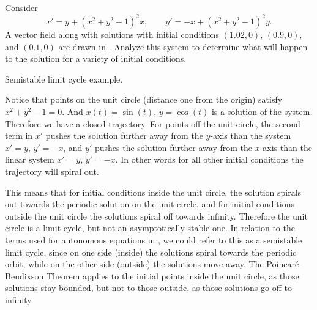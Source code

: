 \documentclass{ximera}
\begin{document}
\begin{example}
    Consider
    \begin{equation*}
        x' = y + {(x^2+y^2-1)}^2 x, \qquad y' = -x + {(x^2+y^2-1)}^2 y.
    \end{equation*}
    A vector field along with solutions with initial conditions $(1.02,0)$, $(0.9,0)$, and $(0.1,0)$ are drawn in . Analyze this system to determine what will happen to the solution for a variety of initial conditions.
    
    \begin{myfig}
        \capstart
        \caption{Semistable limit cycle example.\label{fig:nlin-unstable-limit-cycle}}
    \end{myfig}
\end{example}

\begin{exampleSol}
    Notice that points on the unit circle (distance one from the origin) satisfy $x^2+y^2-1=0$.  And $x(t) = \sin(t)$, $y = \cos(t)$ is a solution of the system.  Therefore we have a closed trajectory. For points off the unit circle, the second term in $x'$ pushes the solution further away from the $y$-axis than the system $x' = y$, $y' = -x$, and $y'$ pushes the solution further away from the $x$-axis than the linear system $x'=y$, $y' = -x$.  In other words for all other initial conditions the trajectory will spiral out.
    
    This means that for initial conditions inside the unit circle, the solution spirals out towards the periodic solution on the unit circle, and for initial conditions outside the unit circle the solutions spiral off towards infinity.  Therefore the unit circle is a limit cycle, but not an asymptotically stable one. In relation to the terms used for autonomous equations in , we could refer to this as a semistable limit cycle, since on one side (inside) the solutions spiral towards the periodic orbit, while on the other side (outside) the solutions move away. The Poincar\'e--Bendixson Theorem applies to the initial points inside the unit circle, as those solutions stay bounded, but not to those outside, as those solutions go off to infinity.
\end{exampleSol}
\end{document}
